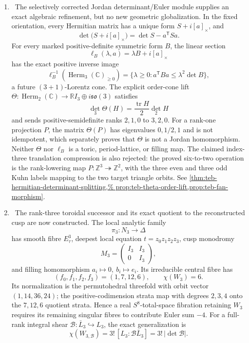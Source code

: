 \begin{enumerate}[leftmargin=1.8em]
\item \Verified\ The selectively corrected Jordan determinant/Euler module supplies an exact
algebraic refinement, but no new geometric globalization.  In the fixed
orientation, every Hermitian matrix has a unique form
\(S+i[a]_{\times}\), and
\[
 \det\bigl(S+i[a]_{\times}\bigr)=\det S-a^{\mathsf T}Sa.
\]
For every marked positive-definite symmetric form \(B\), the linear section
\[
 \ell_B(\lambda,a)=\lambda B+i[a]_{\times}
\]
has the exact positive inverse image
\[
 \ell_B^{-1}\!\left(\operatorname{Herm}_3(\mathbb C)_{\geq0}\right)
 =\{\lambda\geq0:a^{\mathsf T}Ba\leq\lambda^2\det B\},
\]
a future \((3+1)\)-Lorentz cone.  The explicit order-cone lift
\(\Theta:\operatorname{Herm}_2(\mathbb C)\to
\mathbb RI_3\oplus i\mathfrak{so}(3)\) satisfies
\[
 \det_3\Theta(H)=\frac{\operatorname{tr}H}{2}\det_2H
\]
and sends positive-semidefinite ranks \(2,1,0\) to \(3,2,0\).
For a rank-one projection \(P\), the matrix \(\Theta(P)\) has eigenvalues
\(0,1/2,1\) and is not idempotent, which separately proves that \(\Theta\)
is not a Jordan homomorphism.  Neither \(\Theta\) nor \(\ell_B\) is a
toric, period-lattice, or filling map.  The claimed index-three translation
compression is also rejected: the proved six-to-two operation is the
rank-lowering map \(P:\mathbb Z^3\twoheadrightarrow\mathbb Z^2\), with the
three even and three odd Kuhn labels mapping to the two target triangle
orbits.  See
\cref{thm:teb-hermitian-determinant-splitting,%
prop:teb-theta-order-lift,prop:teb-fan-morphism}.

\item \Verified\ The rank-three toroidal successor and its exact quotient to
the reconstructed cusp are now constructed.  The local analytic family
\[
 \pi_3:N_3\longrightarrow\Delta
\]
has smooth fibre \(E_\tau^3\), deepest local equation
\(t=z_0z_1z_2z_3\), cusp monodromy
\[
 M_3=\begin{pmatrix}I_3&I_3\\0&I_3\end{pmatrix},
\]
and filling homomorphism \(a_i\mapsto0,\ b_i\mapsto e_i\).  Its irreducible
central fibre has
\[
 (f_0,f_1,f_2,f_3)=(1,7,12,6),\qquad \chi(W_3)=6.
\]
Its normalization is the permutohedral threefold with orbit vector
\((1,14,36,24)\); the positive-codimension strata map with degrees
\(2,3,4\) onto the \(7,12,6\) quotient strata.  Hence a real
\(S^8\)-total-space fibration retaining \(W_3\) requires its remaining
singular fibres to contribute Euler sum \(-4\).
For a full-rank integral shear
\(\mathcal B:\bar L_3\hookrightarrow L_3\), the exact generalization is
\[
 \chi(W_{3,\mathcal B})
 =3!\,[L_3:\mathcal B\bar L_3]
 =3!\,|\det\mathcal B|.
\]


\end{enumerate}
